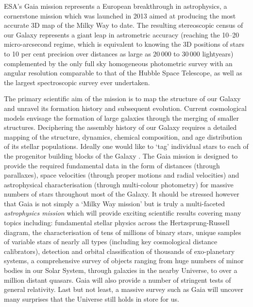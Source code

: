 ESA's Gaia mission \cite{2016A&A...595A...1G} represents a European breakthrough in astrophysics, a cornerstone mission which was launched in 2013 aimed at producing the most accurate 3D map of the Milky Way to date. The resulting stereoscopic census of our Galaxy represents a giant leap in astrometric accuracy (reaching the 10--20 micro-arcsecond regime, which is equivalent to knowing the 3D positions of stars to 10 per cent precision over distances as large as $20\,000$ to $30\,000$ lightyears) complemented by the only full sky homogeneous photometric survey with an angular resolution comparable to that of the Hubble Space Telescope, as well as the largest spectroscopic survey ever undertaken. 

The primary scientific aim of the mission is to map the structure of our Galaxy and unravel its formation history and subsequent evolution. Current cosmological models envisage the formation of large galaxies through the merging of smaller structures. Deciphering the assembly history of our Galaxy requires a detailed mapping of the structure, dynamics, chemical composition, and age distribution of its stellar populations. Ideally one would like to `tag' individual stars to each of the progenitor building blocks of the Galaxy \cite{2002ARA&A..40..487F}. The Gaia mission is designed to provide the required fundamental data in the form of distances (through parallaxes), space velocities (through proper motions and radial velocities) and astrophysical characterisation (through multi-colour photometry) for massive numbers of stars throughout most of the Galaxy. It should be stressed however that Gaia is not simply a `Milky Way mission' but is truly a multi-faceted {\em astrophysics mission} which will provide exciting scientific results covering many topics including: fundamental stellar physics across the Hertzsprung-Russell diagram, the characterisation of tens of millions of binary stars, unique samples of variable stars of nearly all types (including key cosmological distance calibrators), detection and orbital classification of thousands of exo-planetary systems, a comprehensive survey of objects ranging from huge numbers of minor bodies in our Solar System, through galaxies in the nearby Universe, to over a million distant quasars. Gaia will also provide a number of stringent tests of general relativity. Last but not least, a massive survey such as Gaia will uncover many surprises that the Universe still holds in store for us.

